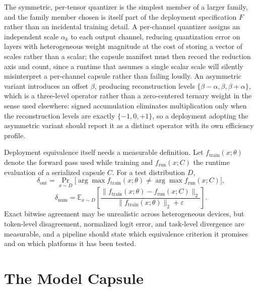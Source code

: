The symmetric, per-tensor quantizer is the simplest member of a larger family, and the family member chosen is itself part of the deployment specification $F$ rather than an incidental training detail. A per-channel quantizer assigns an independent scale $\alpha_k$ to each output channel, reducing quantization error on layers with heterogeneous weight magnitude at the cost of storing a vector of scales rather than a scalar; the capsule manifest must then record the reduction axis and count, since a runtime that assumes a single scalar scale will silently misinterpret a per-channel capsule rather than failing loudly. An asymmetric variant introduces an offset $\beta$, producing reconstruction levels $\{\beta-\alpha,\beta,\beta+\alpha\}$, which is a three-level operator rather than a zero-centered ternary weight in the sense used elsewhere: signed accumulation eliminates multiplication only when the reconstruction levels are exactly $\{-1,0,+1\}$, so a deployment adopting the asymmetric variant should report it as a distinct operator with its own efficiency profile.

Deployment equivalence itself needs a measurable definition. Let $f_{\mathrm{train}}(x;\theta)$ denote the forward pass used while training and $f_{\mathrm{run}}(x;C)$ the runtime evaluation of a serialized capsule $C$. For a test distribution $D$,
\[
\delta_{\mathrm{out}} = \Pr_{x\sim D}\bigl[ \arg\max f_{\mathrm{train}}(x;\theta) \neq \arg\max f_{\mathrm{run}}(x;C) \bigr],
\]
\[
\delta_{\mathrm{num}} = \mathbb{E}_{x\sim D}\left[ \frac{\|f_{\mathrm{train}}(x;\theta) - f_{\mathrm{run}}(x;C)\|_2}{\|f_{\mathrm{train}}(x;\theta)\|_2 + \varepsilon} \right].
\]
Exact bitwise agreement may be unrealistic across heterogeneous devices, but token-level disagreement, normalized logit error, and task-level divergence are measurable, and a pipeline should state which equivalence criterion it promises and on which platforms it has been tested.

\section{The Model Capsule}

